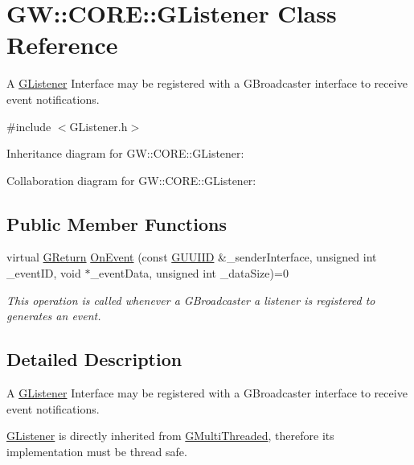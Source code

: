 \hypertarget{classGW_1_1CORE_1_1GListener}{}\section{GW\+::C\+O\+RE\+::G\+Listener Class Reference}
\label{classGW_1_1CORE_1_1GListener}


A \mbox{\hyperlink{classGW_1_1CORE_1_1GListener}{G\+Listener}} Interface may be registered with a G\+Broadcaster interface to receive event notifications.  




{\ttfamily \#include $<$G\+Listener.\+h$>$}



Inheritance diagram for GW\+::C\+O\+RE\+::G\+Listener\+:


Collaboration diagram for GW\+::C\+O\+RE\+::G\+Listener\+:
\subsection*{Public Member Functions}
\begin{DoxyCompactItemize}
\item 
virtual \mbox{\hyperlink{namespaceGW_a67a839e3df7ea8a5c5686613a7a3de21}{G\+Return}} \mbox{\hyperlink{classGW_1_1CORE_1_1GListener_a5c1d1fac213b7a1cc15d384aa0c33105}{On\+Event}} (const \mbox{\hyperlink{structGW_1_1GUUIID}{G\+U\+U\+I\+ID}} \&\+\_\+sender\+Interface, unsigned int \+\_\+event\+ID, void $\ast$\+\_\+event\+Data, unsigned int \+\_\+data\+Size)=0
\begin{DoxyCompactList}\small\item\em This operation is called whenever a G\+Broadcaster a listener is registered to generates an event. \end{DoxyCompactList}\end{DoxyCompactItemize}


\subsection{Detailed Description}
A \mbox{\hyperlink{classGW_1_1CORE_1_1GListener}{G\+Listener}} Interface may be registered with a G\+Broadcaster interface to receive event notifications. 

\mbox{\hyperlink{classGW_1_1CORE_1_1GListener}{G\+Listener}} is directly inherited from \mbox{\hyperlink{classGW_1_1CORE_1_1GMultiThreaded}{G\+Multi\+Threaded}}, therefore its implementation must be thread safe. 

